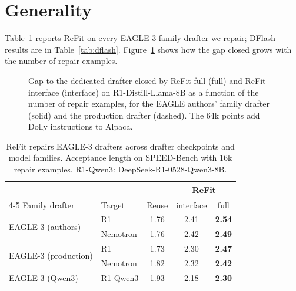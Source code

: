 \documentclass[11pt]{article}
\newcommand{\refit}{ReFit}
\newcommand{\refitI}{ReFit-interface}
\newcommand{\refitF}{ReFit-full}
\begin{document}
\section{Generality}
\label{app:generality}

Table~\ref{tab:robustness} reports \refit{} on every EAGLE-3 family drafter we repair; DFlash results are in Table~\ref{tab:dflash}. Figure~\ref{fig:scaling} shows how the gap closed grows with the number of repair examples.

\begin{figure}[h]
  \centering
  
  \caption{Gap to the dedicated drafter closed by \refitF{} (full) and \refitI{} (interface) on R1-Distill-Llama-8B as a function of the number of repair examples, for the EAGLE authors' family drafter (solid) and the production drafter (dashed). The 64k points add Dolly instructions to Alpaca.}
  \label{fig:scaling}
\end{figure}

\begin{table}[h]
  \centering
  \small
  \setlength{\tabcolsep}{3.0pt}
  \begin{tabular}{@{}llccc@{}}
    \toprule
    & & & \multicolumn{2}{c}{\refit{}} \\
    \cmidrule(l){4-5}
    Family drafter & Target & Reuse & interface & full \\
    \midrule
    \multirow{2}{*}{EAGLE-3 (authors)} & R1 & 1.76 & 2.41 & \textbf{2.54} \\
                                 & Nemotron & 1.76 & 2.42 & \textbf{2.49} \\
    \multirow{2}{*}{EAGLE-3 (production)} & R1 & 1.73 & 2.30 & \textbf{2.47} \\
                                 & Nemotron & 1.82 & 2.32 & \textbf{2.42} \\
    \midrule
    EAGLE-3 (Qwen3) & R1-Qwen3 & 1.93 & 2.18 & \textbf{2.30} \\
    \bottomrule
  \end{tabular}
  \caption{\refit{} repairs EAGLE-3 drafters across drafter checkpoints and model families. Acceptance length on SPEED-Bench with 16k repair examples. R1-Qwen3: DeepSeek-R1-0528-Qwen3-8B.}
  \label{tab:robustness}
\end{table}

\end{document}
